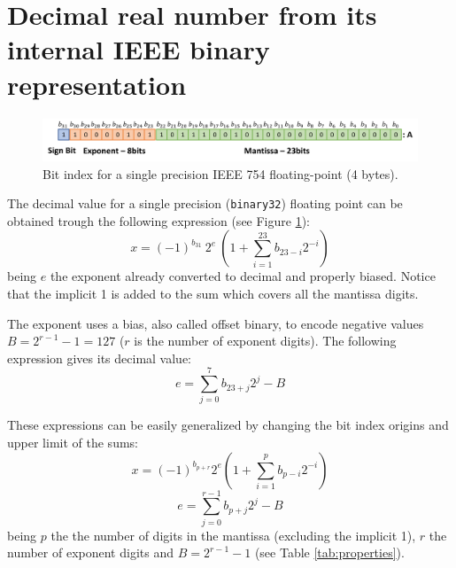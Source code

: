    \section{Decimal real number from its internal IEEE binary representation}


\FloatBarrier 
\begin{figure}[H]
    \centering
    \includegraphics[width= \textwidth]{./doc/Figures/singlebits.png}
    \caption{Bit index for a single precision IEEE 754 floating-point (4 bytes).}
    \label{fig:singlebits}
\end{figure}

The decimal value for a single precision (\texttt{binary32}) floating point can be obtained trough the following expression (see Figure \ref{fig:singlebits}):
$$
   x = (-1)^{b_{31}}  \:  2^e  \: \left( 1 +   \sum_{i=1}^{23} b_{23-i} 2^{-i}    \right) 
$$
being $e$ the exponent already converted to decimal and properly biased. 
Notice that the implicit 1 is added to the sum which covers all the mantissa digits. 

The exponent uses a bias, also called  offset binary, to encode negative values $B = 2^{r-1} - 1 = 127$ ($r$ is the number of exponent digits). 
The following expression gives its decimal value:
$$
e = \sum_{j=0}^{7} b_{23+j} 2^j - B
$$
 

% 
 
\begin{IN}
    These expressions can be easily generalized by changing the bit index origins and upper limit of the sums:
    $$
    x = (-1)^{b_{p+r}}  2^e \left( 1 +   \sum_{i=1}^{p} b_{p-i} 2^{-i}    \right) 
    $$
    $$
    e = \sum_{j=0}^{r-1} b_{p+j} 2^j - B
    $$
    being $p$ the the number of digits in the mantissa (excluding the implicit 1), $r$ the number of exponent digits and $B = 2^{r-1} - 1$ (see Table \ref{tab:properties}).   
\end{IN}




